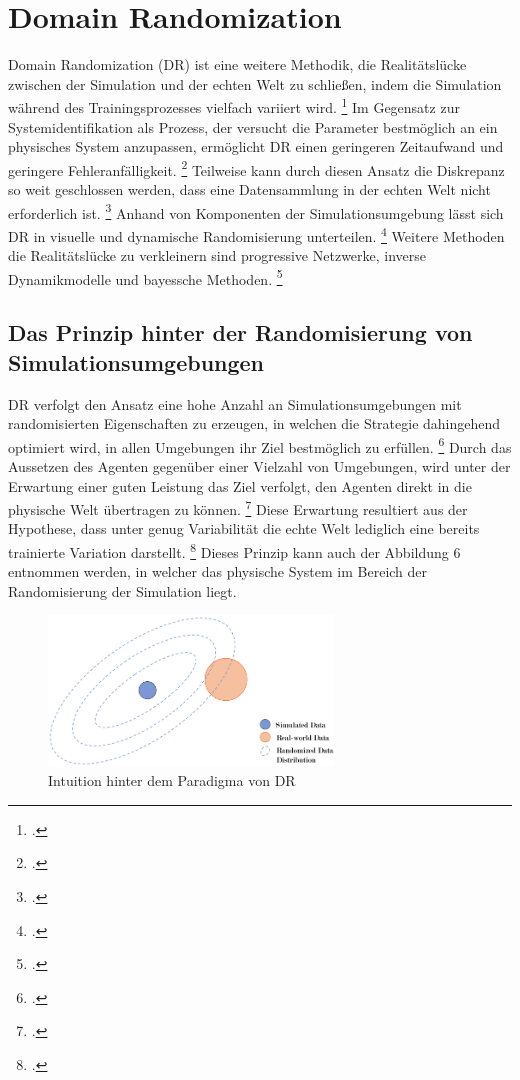 \section{Domain Randomization}

Domain Randomization (DR) ist eine weitere Methodik, die Realitätslücke zwischen der Simulation und der echten Welt zu schließen, indem die Simulation während des Trainingsprozesses vielfach variiert wird. \footcite[Vgl.][S. 3]{Bharadhwaj.2019}
Im Gegensatz zur Systemidentifikation als Prozess, der versucht die Parameter bestmöglich an ein physisches System anzupassen, ermöglicht DR einen geringeren Zeitaufwand und geringere Fehleranfälligkeit. \footcite[Vgl.][S. 1]{Tobin.2017}
Teilweise kann durch diesen Ansatz die Diskrepanz so weit geschlossen werden, dass eine Datensammlung in der echten Welt nicht erforderlich ist. \footcite[Vgl.][S. 2]{Molchanov.2019}
Anhand von Komponenten der Simulationsumgebung lässt sich DR in visuelle und dynamische Randomisierung unterteilen. \footcite[Vgl.][S. 5]{Zhao.2020}
Weitere Methoden die Realitätslücke zu verkleinern sind progressive Netzwerke, inverse Dynamikmodelle und bayessche Methoden. \footcite[Vgl.][S. 2]{Chen.2021}

\subsection{Das Prinzip hinter der Randomisierung von Simulationsumgebungen}

DR verfolgt den Ansatz eine hohe Anzahl an Simulationsumgebungen mit randomisierten Eigenschaften zu erzeugen, in welchen die Strategie dahingehend optimiert wird, in allen Umgebungen ihr Ziel bestmöglich zu erfüllen. \footcite[Vgl.][S. 1]{Hsu.2023}
Durch das Aussetzen des Agenten gegenüber einer Vielzahl von Umgebungen, wird unter der Erwartung einer guten Leistung das Ziel verfolgt, den Agenten direkt in die physische Welt übertragen zu können. \footcite[Vgl.][S. 2]{Chen.2021}
Diese Erwartung resultiert aus der Hypothese, dass unter genug Variabilität die echte Welt lediglich eine bereits trainierte Variation darstellt. \footcite[Vgl.][S. 1]{Tobin.2017}
Dieses Prinzip kann auch der Abbildung 6 entnommen werden, in welcher das physische System im Bereich der Randomisierung der Simulation liegt. 

\begin{figure}[htb]
    \centering
    \includegraphics[height=4cm]{lib/graphics/Domain_randomization.png}
    \caption[Intuition hinter dem Paradigma von DR]{Intuition hinter dem Paradigma von DR\footnotemark}
    \label{abb:Domain_randomization}
\end{figure}

